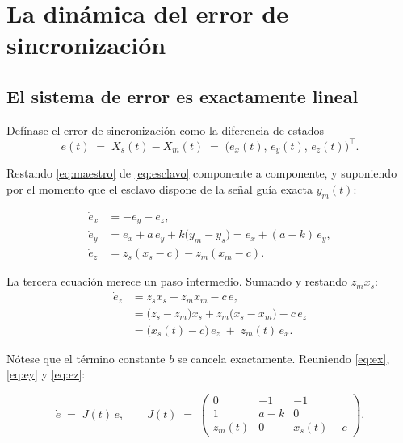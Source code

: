 \documentclass[12pt,a4paper]{article}
\begin{document}
\section{La dinámica del error de sincronización}
\label{sec:error}

\subsection{El sistema de error es exactamente lineal}

Defínase el error de sincronización como la diferencia de estados
\[
  e(t) \;=\; X_s(t) - X_m(t) \;=\; \bigl(e_x(t),\,e_y(t),\,e_z(t)\bigr)^{\!\top}.
\]

Restando \eqref{eq:maestro} de \eqref{eq:esclavo} componente a componente, y
suponiendo por el momento que el esclavo dispone de la señal guía exacta $y_m(t)$:

\begin{align}
  \dot{e}_x &= -e_y - e_z, \label{eq:ex}\\[0.2em]
  \dot{e}_y &= e_x + a\,e_y + k\bigl(y_m - y_s\bigr)
             = e_x + (a-k)\,e_y, \label{eq:ey}\\[0.2em]
  \dot{e}_z &= z_s(x_s-c) - z_m(x_m-c). \label{eq:ez0}
\end{align}

La tercera ecuación merece un paso intermedio. Sumando y restando $z_m x_s$:
\begin{align}
  \dot{e}_z
   &= z_s x_s - z_m x_m - c\,e_z \nonumber\\
   &= \bigl(z_s - z_m\bigr)x_s + z_m\bigl(x_s - x_m\bigr) - c\,e_z \nonumber\\
   &= \bigl(x_s(t) - c\bigr)\,e_z \;+\; z_m(t)\,e_x. \label{eq:ez}
\end{align}

Nótese que el término constante $b$ se cancela exactamente. Reuniendo
\eqref{eq:ex}, \eqref{eq:ey} y \eqref{eq:ez}:

\begin{equation}
\label{eq:sistema-error}
\dot{e} \;=\; J(t)\,e,
\qquad
J(t) \;=\;
\begin{pmatrix}
   0        & -1   & -1 \\
   1        & a-k  & 0  \\
   z_m(t)   & 0    & x_s(t)-c
\end{pmatrix}.
\end{equation}
\end{document}
